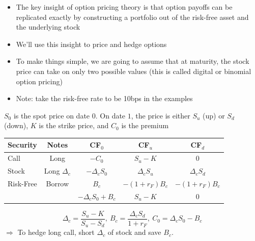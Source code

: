 \documentclass{beamer}
\begin{document}
\begin{frame}{}
	\begin{itemize}
		\item The key insight of option pricing theory is that option payoffs can be replicated exactly by constructing a portfolio out of the risk-free asset and the underlying stock
		\item We'll use this insight to price and hedge options
		\item To make things simple, we are going to assume that at maturity, the stock price can take on only two possible values (this is called digital or binomial option pricing)
		\item Note: take the risk-free rate to be 10bps in the examples
	\end{itemize}
\end{frame}

\begin{frame}{}
	$S_{0}$ is the spot price on date $0$. On date $1$, the price is either $S_{u}$ (up) or $S_{d}$ (down), $K$ is the strike price, and $C_{0}$ is the premium
    \begin{center}
        \begin{tabular}{lcccc}
			Security & Notes & CF$_{0}$ & CF$_{u}$ & CF$_{d}$ \\ \hline\hline
			Call & Long & $-C_{0}$ & $S_{u}-K$ &$0$\\ \hline\hline
			Stock & Long $\Delta_{c}$  & $-\Delta_{c} S_{0}$ & $\Delta_{c} S_{u}$ & $\Delta_{c} S_{d}$ \\
			Risk-Free & Borrow & $B_{c}$ & $-(1+r_{F})B_{c}$ & $-(1+r_{F})B_{c}$\\ \hline
			& & $-\Delta_{c} S_{0}+B_{c}$ & $S_{u}-K$ & $0$ \\ \hline\hline
        \end{tabular}
    \end{center}
	\begin{equation}
		\boxed{\Delta_{c}=\frac{S_{u}-K}{S_{u}-S_{d}},\:B_{c}=\frac{\Delta_{c}S_{d}}{1+r_{F}},\:C_{0}=\Delta_{c}S_{0}-B_{c}}
	\end{equation}
	$\Rightarrow$ To hedge long call, short $\Delta_{c}$ of stock and save $B_{c}$.
\end{frame}

\begin{frame}{}
	
\end{frame}
\end{document}
